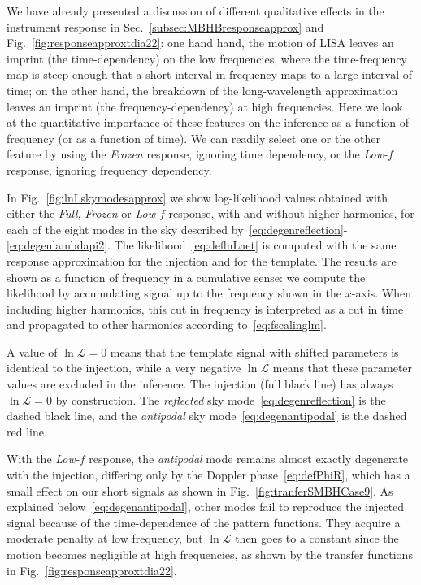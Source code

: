 \documentclass[aps,showpacs,twocolumn,prd,superscriptaddress,nofootinbib]{revtex4-1}
\newcommand\calL{{\mathcal{L}}}
\begin{document}
We have already presented a discussion of different qualitative effects in the instrument response in Sec.~\ref{subsec:MBHBresponseapprox} and Fig.~\ref{fig:responseapproxtdia22}: one hand hand, the motion of LISA leaves an imprint (the time-dependency) on the low frequencies, where the time-frequency map is steep enough that a short interval in frequency maps to a large interval of time; on the other hand, the breakdown of the long-wavelength approximation leaves an imprint (the frequency-dependency) at high frequencies. Here we look at the quantitative importance of these features on the inference as a function of frequency (or as a function of time). We can readily select one or the other feature by using the \textit{Frozen} response, ignoring time dependency, or the \textit{Low-$f$} response, ignoring frequency dependency.

In Fig.~\ref{fig:lnLskymodesapprox} we show log-likelihood values obtained with either the \textit{Full}, \textit{Frozen} or \textit{Low-$f$} response, with and without higher harmonics, for each of the eight modes in the sky described by~\eqref{eq:degenreflection}-\eqref{eq:degenlambdapi2}. The likelihood~\eqref{eq:deflnLaet} is computed with the same response approximation for the injection and for the template. The results are shown as a function of frequency in a cumulative sense: we compute the likelihood by accumulating signal up to the frequency shown in the $x$-axis. When including higher harmonics, this cut in frequency is interpreted as a cut in time and propagated to other harmonics according to~\eqref{eq:fscalinglm}.

A value of $\ln \calL = 0$ means that the template signal with shifted parameters is identical to the injection, while a very negative $\ln \calL$ means that these parameter values are excluded in the inference. The injection (full black line) has always $\ln \calL = 0$ by construction. The \textit{reflected} sky mode~\eqref{eq:degenreflection} is the dashed black line, and the \textit{antipodal} sky mode~\eqref{eq:degenantipodal} is the dashed red line. 

With the \textit{Low-$f$} response, the \textit{antipodal} mode remains almost exactly degenerate with the injection, differing only by the Doppler phase~\eqref{eq:defPhiR}, which has a small effect on our short signals as shown in Fig.~\ref{fig:tranferSMBHCase9}. As explained below~\eqref{eq:degenantipodal}, other modes fail to reproduce the injected signal because of the time-dependence of the pattern functions. They acquire a moderate penalty at low frequency, but $\ln \calL$ then goes to a constant since the motion becomes negligible at high frequencies, as shown by the transfer functions in Fig.~\ref{fig:responseapproxtdia22}.
\end{document}
